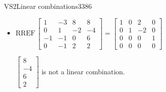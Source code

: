 \begin{exercise}{VS2}{Linear combinations}{3386}
\begin{exerciseAnswer}
\begin{itemize}
 
\item  

 \(
\mathrm{RREF}\, \left[\begin{array}{ccc|c}
1 & -3 & 8 & 8 \\
0 & 1 & -2 & -4 \\
-1 & -1 & 0 & 6 \\
0 & -1 & 2 & 2
\end{array}\right] = \left[\begin{array}{ccc|c}
1 & 0 & 2 & 0 \\
0 & 1 & -2 & 0 \\
0 & 0 & 0 & 1 \\
0 & 0 & 0 & 0
\end{array}\right]
                        \) 

 

 \(\left[\begin{array}{c}
8 \\
-4 \\
6 \\
2
\end{array}\right]\) is not a linear combination. 

 
\end{itemize}

     \end{exerciseAnswer}
 \end{exercise}


